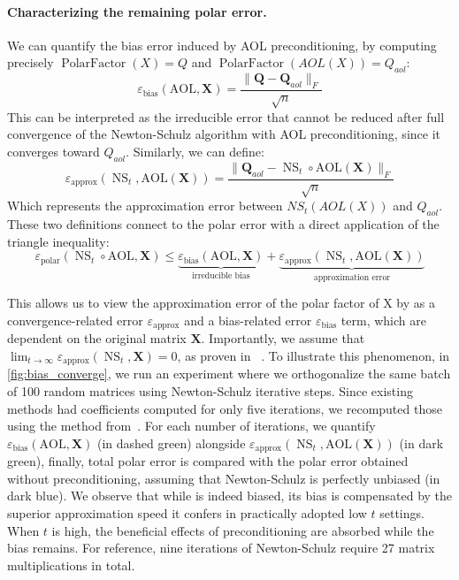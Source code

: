 \paragraph{Characterizing the remaining polar error.}
We can quantify the bias error induced by AOL preconditioning, by computing precisely $\operatorname{PolarFactor}(X) = Q$ and $\operatorname{PolarFactor}(AOL(X)) = Q_{aol}$:
\[
    \varepsilon_{\text{bias}}(\mathrm{AOL}, \mathbf{X}) = \frac{\| \textbf{Q} - \textbf{Q}_{aol} \|_F}{\sqrt{n}}
\]
This can be interpreted as the irreducible error that cannot be reduced after full convergence of the Newton-Schulz algorithm with AOL preconditioning, since it converges toward $Q_{aol}$.
Similarly, we can define:
\[
    \varepsilon_{\text{approx}}(\operatorname{NS}_t, \textrm{AOL}(\mathbf{X})) = \frac{\|  \textbf{Q}_{aol} - \operatorname{NS}_t\circ\textrm{AOL}(\mathbf{X}) \|_F}{\sqrt{n}}
\]
Which represents the approximation error between $NS_t(AOL(X))$ and $Q_{aol}$.
These two definitions connect to the polar error with a direct application of the triangle inequality:
\[
    \varepsilon_{\text{polar}}(\operatorname{NS}_t\circ\textrm{AOL}, \mathbf{X}) \leq  
    \underbrace{\varepsilon_{\text{bias}}(\textrm{AOL}, \mathbf{X})}_{\text{irreducible bias}} + 
    \underbrace{\varepsilon_{\text{approx}}(\operatorname{NS}_t, \textrm{AOL}(\mathbf{X}))}_{\text{approximation error}}
\]

This allows us to view the approximation error of the polar factor of X by \turbomuon as a convergence-related error $\varepsilon_\text{approx}$ and a bias-related error $\varepsilon_\text{bias}$ term, which are dependent on the original matrix $\mathbf{X}$. Importantly, we assume that $\lim_{t\to\infty} \varepsilon_\text{approx}(\operatorname{NS}_t, \mathbf{X}) = 0$, as proven in ~\cite{bjorck1971iterative}. To illustrate this phenomenon, in \cref{fig:bias_converge}, we run an experiment where we orthogonalize the same batch of 100 random matrices using Newton-Schulz iterative steps. Since existing methods had coefficients computed for only five iterations, we recomputed those using the method from~\cite{amsel2025polar}. 
For each number of iterations, we quantify $\varepsilon_{\text{bias}}(\textrm{AOL}, \mathbf{X})$ (in dashed green) alongside $\varepsilon_{\text{approx}}(\operatorname{NS}_t, \textrm{AOL}(\mathbf{X}))$ (in dark green), finally, total polar error is compared with the polar error obtained without preconditioning, assuming that Newton-Schulz is perfectly unbiased (in dark blue).
We observe that while \turbomuon is indeed biased, its bias is compensated by the superior approximation speed it confers in practically adopted low $t$ settings. When $t$ is high, the beneficial effects of preconditioning are absorbed while the bias remains. For reference, nine iterations of Newton-Schulz require 27 matrix multiplications in total.


